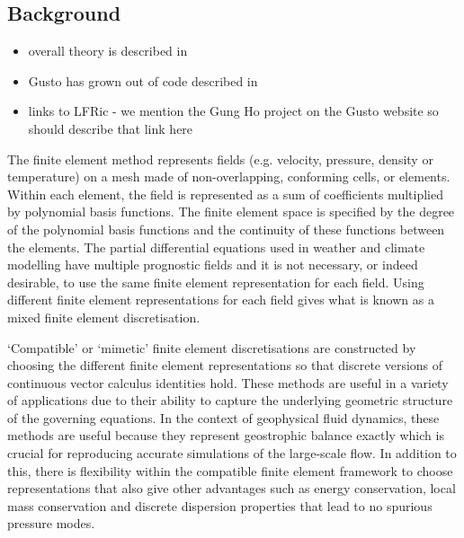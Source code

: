 \documentclass[journal abbreviation, manuscript]{copernicus}
\begin{document}
\subsection{Background}

\begin{itemize}
\item overall theory is described in \citet{gibson2019compatible, cotter2023compatible}
\item Gusto has grown out of code described in \citet{natale2016compatible, cotter2012mixed, bendall2019recovered, bendall2020compatible, yamazaki2017vertical, shipton2018higher}
\item links to LFRic - we mention the Gung Ho project on the Gusto website so should describe that link here
\end{itemize}

The finite element method represents fields (e.g. velocity, pressure,
density or temperature) on a mesh made of non-overlapping, conforming
cells, or elements. Within each element, the field is represented as a
sum of coefficients multiplied by polynomial basis functions. The
finite element space is specified by the degree of the polynomial
basis functions and the continuity of these functions between the
elements. The partial differential equations used in weather and
climate modelling have multiple prognostic fields and it is not
necessary, or indeed desirable, to use the same finite element
representation for each field. Using different finite element
representations for each field gives what is known as a mixed finite
element discretisation.

`Compatible' or `mimetic' finite element discretisations are
constructed by choosing the different finite element representations
so that discrete versions of continuous vector calculus identities
hold. These methods are useful in a variety of applications due to
their ability to capture the underlying geometric structure of the
governing equations. In the context of geophysical fluid dynamics,
these methods are useful because they represent geostrophic balance
exactly which is crucial for reproducing accurate simulations of the
large-scale flow. In addition to this, there is flexibility within the
compatible finite element framework to choose representations that
also give other advantages such as energy conservation, local mass
conservation and discrete dispersion properties that lead to no
spurious pressure modes.
\end{document}
